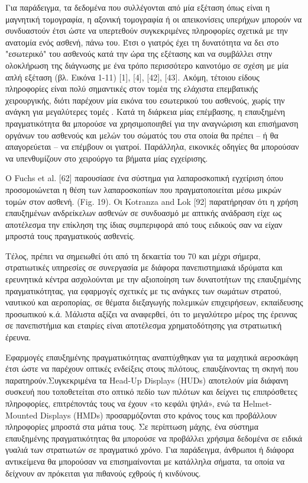 Για παράδειγμα, τα δεδομένα που συλλέγονται από μία εξέταση όπως είναι η μαγνητική τομογραφία, η αξονική τομογραφία ή οι απεικονίσεις υπερήχων μπορούν να συνδυαστούν έτσι ώστε να υπερτεθούν συγκεκριμένες πληροφορίες σχετικά με την ανατομία ενός ασθενή, πάνω του. Έτσι ο γιατρός έχει τη δυνατότητα να δει στο "εσωτερικό" του ασθενούς κατά την ώρα της εξέτασης και να συμβάλλει στην ολοκλήρωση της διάγνωσης με ένα τρόπο περισσότερο καινοτόμο σε σχέση με μία απλή εξέταση (βλ. Εικόνα 1-11) [1], [4], [42], [43]. Ακόμη, τέτοιου είδους πληροφορίες είναι πολύ σημαντικές στον τομέα της ελάχιστα επεμβατικής χειρουργικής, διότι παρέχουν μία εικόνα του εσωτερικού του ασθενούς, χωρίς την ανάγκη για μεγαλύτερες τομές \cite{fuchs1998augmented}. Κατά τη διάρκεια μίας επέμβασης, η επαυξημένη πραγματικότητα θα μπορούσε να χρησιμοποιηθεί για την αναγνώριση και επισήμανση οργάνων του ασθενούς και μελών του σώματός του στα οποία θα πρέπει – ή θα απαγορεύεται – να επέμβουν οι γιατροί. Παράλληλα, εικονικές οδηγίες θα μπορούσαν να υπενθυμίζουν στο χειρούργο τα βήματα μίας εγχείρισης.

Ο Fuchs et al. [62] παρουσίασε ένα σύστημα για λαπαροσκοπική εγχείριση όπου προσομοιώνεται η θέση των λαπαροσκοπίων που πραγματοποιείται μέσω μικρών τομών στον ασθενή. (Fig. 19). Οι Kotranza and Lok [92] παρατήρησαν ότι η χρήση επαυξημένων ανδρείκελων ασθενών σε συνδυασμό με απτικής ανάδραση είχε ως αποτέλεσμα την επίκληση της ίδιας συμπεριφορά από τους ειδικούς σαν να είχαν μπροστά τους πραγματικούς ασθενείς. 






Τέλος, πρέπει να σημειωθεί ότι από τη δεκαετία του 70 και μέχρι σήμερα, στρατιωτικές υπηρεσίες σε συνεργασία με διάφορα πανεπιστημιακά ιδρύματα και ερευνητικά κέντρα ασχολούνται με την αξιοποίηση των δυνατοτήτων της επαυξημένης πραγματικότητας, για εφαρμογές σχετικές με τις ανάγκες των σωμάτων στρατού, ναυτικού και αεροπορίας, σε θέματα διεξαγωγής πολεμικών επιχειρήσεων, εκπαίδευσης προσωπικού κ.ά. Μάλιστα αξίζει να αναφερθεί, ότι το μεγαλύτερο μέρος της έρευνας σε πανεπιστήμια και εταιρίες είναι αποτέλεσμα χρηματοδότησης για στρατιωτική έρευνα.


Εφαρμογές επαυξημένης πραγματικότητας αναπτύχθηκαν για τα μαχητικά αεροσκάφη έτσι ώστε να παρέχουν οπτικές ενδείξεις στους πιλότους, επαυξάνοντας τη σκηνή που παρατηρούν.Συγκεκριμένα τα Head-Up Displays (HUDs) αποτελούν μία διάφανη συσκευή που τοποθετείται στο οπτικό πεδίο των πιλότων και δείχνει τις επιπρόσθετες πληροφορίες, επιτρέποντάς τους να έχουν «το κεφάλι ψηλά», ενώ τα Helmet-Mounted Displays (HMDs) προσαρμόζονται στο κράνος τους και προβάλλουν πληροφορίες μπροστά στα μάτια τους. Σε περίπτωση μάχης, ένα σύστημα επαυξημένης πραγματικότητας θα μπορούσε να προβάλλει χρήσιμα δεδομένα σε ειδικά γυαλιά των στρατιωτών σε πραγματικό χρόνο. Για παράδειγμα, άνθρωποι ή διάφορα αντικείμενα θα μπορούσαν να επισημαίνονται με κατάλληλα σήματα, τα οποία να δείχνουν αν πρόκειται για πιθανούς εχθρούς ή κινδύνους. 


